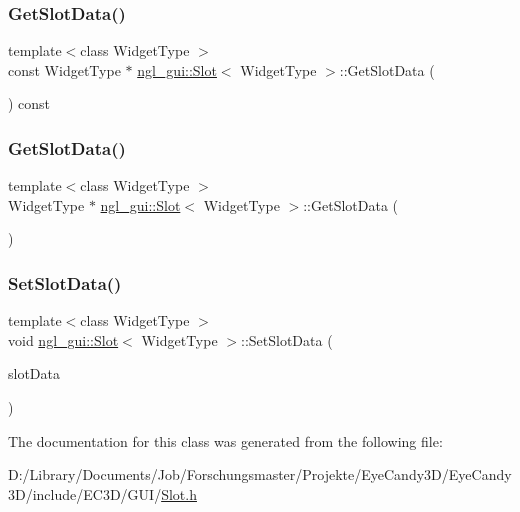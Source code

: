 \subsubsection{\texorpdfstring{Get\+Slot\+Data()}{GetSlotData()}\hspace{0.1cm}{\footnotesize\ttfamily [1/2]}}
{\footnotesize\ttfamily template$<$class Widget\+Type $>$ \\
const Widget\+Type $\ast$ \mbox{\hyperlink{classngl__gui_1_1_slot}{ngl\+\_\+gui\+::\+Slot}}$<$ Widget\+Type $>$\+::Get\+Slot\+Data (\begin{DoxyParamCaption}{ }\end{DoxyParamCaption}) const}

\mbox{\label{classngl__gui_1_1_slot_a82f84f6347bb881094216db92d8bd274}} 
\subsubsection{\texorpdfstring{Get\+Slot\+Data()}{GetSlotData()}\hspace{0.1cm}{\footnotesize\ttfamily [2/2]}}
{\footnotesize\ttfamily template$<$class Widget\+Type $>$ \\
Widget\+Type $\ast$ \mbox{\hyperlink{classngl__gui_1_1_slot}{ngl\+\_\+gui\+::\+Slot}}$<$ Widget\+Type $>$\+::Get\+Slot\+Data (\begin{DoxyParamCaption}{ }\end{DoxyParamCaption})}

\mbox{\label{classngl__gui_1_1_slot_a678edc3301f986a708371537d221837b}} 
\subsubsection{\texorpdfstring{Set\+Slot\+Data()}{SetSlotData()}}
{\footnotesize\ttfamily template$<$class Widget\+Type $>$ \\
void \mbox{\hyperlink{classngl__gui_1_1_slot}{ngl\+\_\+gui\+::\+Slot}}$<$ Widget\+Type $>$\+::Set\+Slot\+Data (\begin{DoxyParamCaption}\item[{Widget\+Type $\ast$}]{slot\+Data }\end{DoxyParamCaption})}



The documentation for this class was generated from the following file\+:\begin{DoxyCompactItemize}
\item 
D\+:/\+Library/\+Documents/\+Job/\+Forschungsmaster/\+Projekte/\+Eye\+Candy3\+D/\+Eye\+Candy3\+D/include/\+E\+C3\+D/\+G\+U\+I/\mbox{\hyperlink{_slot_8h}{Slot.\+h}}\end{DoxyCompactItemize}
